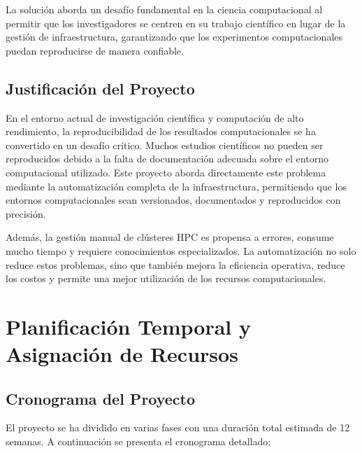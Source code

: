 \documentclass[12pt,a4paper]{report}
\begin{document}
\begin{notacaja}
La solución aborda un desafío fundamental en la ciencia computacional al permitir que los investigadores se centren en su trabajo científico en lugar de la gestión de infraestructura, garantizando que los experimentos computacionales puedan reproducirse de manera confiable.
\end{notacaja}

\section{Justificación del Proyecto}

En el entorno actual de investigación científica y computación de alto rendimiento, la reproducibilidad de los resultados computacionales se ha convertido en un desafío crítico. Muchos estudios científicos no pueden ser reproducidos debido a la falta de documentación adecuada sobre el entorno computacional utilizado. Este proyecto aborda directamente este problema mediante la automatización completa de la infraestructura, permitiendo que los entornos computacionales sean versionados, documentados y reproducidos con precisión.

Además, la gestión manual de clústeres HPC es propensa a errores, consume mucho tiempo y requiere conocimientos especializados. La automatización no solo reduce estos problemas, sino que también mejora la eficiencia operativa, reduce los costos y permite una mejor utilización de los recursos computacionales.

\chapter{Planificación Temporal y Asignación de Recursos}

\section{Cronograma del Proyecto}

El proyecto se ha dividido en varias fases con una duración total estimada de 12 semanas. A continuación se presenta el cronograma detallado:
\end{document}
